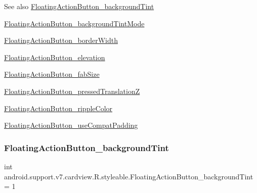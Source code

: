 \begin{DoxySeeAlso}{See also}
\hyperlink{classandroid_1_1support_1_1v7_1_1cardview_1_1R_1_1styleable_ac96a17d99f0790bb52924789602d440b}{Floating\+Action\+Button\+\_\+background\+Tint} 

\hyperlink{classandroid_1_1support_1_1v7_1_1cardview_1_1R_1_1styleable_a7823af4317af3e74f9d2ed0b009312aa}{Floating\+Action\+Button\+\_\+background\+Tint\+Mode} 

\hyperlink{classandroid_1_1support_1_1v7_1_1cardview_1_1R_1_1styleable_a6ade0c9a91640786d052b5ce9007367a}{Floating\+Action\+Button\+\_\+border\+Width} 

\hyperlink{classandroid_1_1support_1_1v7_1_1cardview_1_1R_1_1styleable_a477d324687e0fa87caccb4664d67dbc8}{Floating\+Action\+Button\+\_\+elevation} 

\hyperlink{classandroid_1_1support_1_1v7_1_1cardview_1_1R_1_1styleable_affce83fe036d64bf069fab004a29b09a}{Floating\+Action\+Button\+\_\+fab\+Size} 

\hyperlink{classandroid_1_1support_1_1v7_1_1cardview_1_1R_1_1styleable_a8529a0b7a3336b9f9172273795f573f5}{Floating\+Action\+Button\+\_\+pressed\+TranslationZ} 

\hyperlink{classandroid_1_1support_1_1v7_1_1cardview_1_1R_1_1styleable_aba4e7e7c1ea8caf0dd310ef0ad576337}{Floating\+Action\+Button\+\_\+ripple\+Color} 

\hyperlink{classandroid_1_1support_1_1v7_1_1cardview_1_1R_1_1styleable_a8651097694af5cd9a96507bdc22abdcb}{Floating\+Action\+Button\+\_\+use\+Compat\+Padding} 
\end{DoxySeeAlso}
\mbox{\label{classandroid_1_1support_1_1v7_1_1cardview_1_1R_1_1styleable_ac96a17d99f0790bb52924789602d440b}} 
\subsubsection{\texorpdfstring{Floating\+Action\+Button\+\_\+background\+Tint}{FloatingActionButton\_backgroundTint}}
{\footnotesize\ttfamily int android.\+support.\+v7.\+cardview.\+R.\+styleable.\+Floating\+Action\+Button\+\_\+background\+Tint = 1\hspace{0.3cm}{\ttfamily [static]}}

